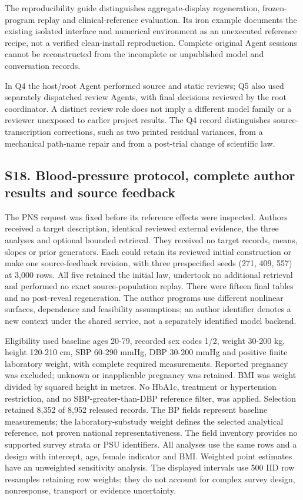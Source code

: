 \documentclass[11pt,letterpaper]{article}
\begin{document}
The reproducibility guide distinguishes aggregate-display regeneration, frozen-program replay and clinical-reference evaluation. Its iron example documents the existing isolated interface and numerical environment as an unexecuted reference recipe, not a verified clean-install reproduction. Complete original Agent sessions cannot be reconstructed from the incomplete or unpublished model and conversation records.


In Q4 the host/\allowbreak{}root Agent performed source and static reviews; Q5 also used separately dispatched review Agents, with final decisions reviewed by the root coordinator. A distinct review role does not imply a different model family or a reviewer unexposed to earlier project results. The Q4 record distinguishes source-transcription corrections, such as two printed residual variances, from a mechanical path-name repair and from a post-trial change of scientific law.


\clearpage

\subsection*{S18. Blood-pressure protocol, complete author results and source feedback}

The PNS request was fixed before its reference effects were inspected. Authors received a target description, identical reviewed external evidence, the three analyses and optional bounded retrieval. They received no target records, means, slopes or prior generators. Each could retain its reviewed initial construction or make one source-feedback revision, with three prespecified seeds (271, 409, 557) at 3,000 rows. All five retained the initial law, undertook no additional retrieval and performed no exact source-population replay. There were fifteen final tables and no post-reveal regeneration. The author programs use different nonlinear surfaces, dependence and feasibility assumptions; an author identifier denotes a new context under the shared service, not a separately identified model backend.


Eligibility used baseline ages 20-79, recorded sex codes 1/\allowbreak{}2, weight 30-200 kg, height 120-210 cm, SBP 60-290 mmHg, DBP 30-200 mmHg and positive finite laboratory weight, with complete required measurements. Reported pregnancy was excluded; unknown or inapplicable pregnancy was retained. BMI was weight divided by squared height in metres. No HbA1c, treatment or hypertension restriction, and no SBP-greater-than-DBP reference filter, was applied. Selection retained 8,352 of 8,952 released records. The BP fields represent baseline measurements; the laboratory-substudy weight defines the selected analytical reference, not proven national representativeness. The field inventory provides no supported survey strata or PSU identifiers. All analyses use the same rows and a design with intercept, age, female indicator and BMI. Weighted point estimates have an unweighted sensitivity analysis. The displayed intervals use 500 IID row resamples retaining row weights; they do not account for complex survey design, nonresponse, transport or evidence uncertainty.
\end{document}
